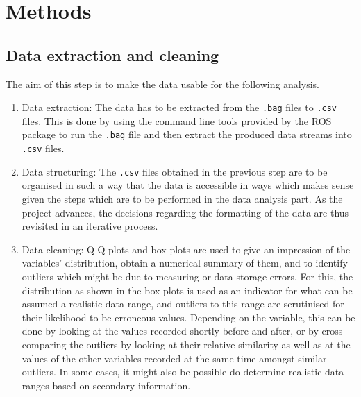 \documentclass[11pt, UKenglish]{report}
\begin{document}
{%

\section*{Methods}

\subsection*{Data extraction and cleaning}

The aim of this step is to make the data usable for the following analysis. 

\begin{enumerate}

	\item{\large{Data extraction:} \normalsize The data has to be extracted from the \texttt{.bag} files to \texttt{.csv} files. This is done by using the command line tools provided by the ROS package to run the \texttt{.bag} file and then extract the produced data streams into \texttt{.csv} files.} 

	\item{\large{Data structuring:} \normalsize The \texttt{.csv} files obtained in the previous step are to be organised in such a way that the data is accessible in ways which makes sense given the steps which are to be performed in the data analysis part. As the project advances, the decisions regarding the formatting of the data are thus revisited in an iterative process.}

	\item{\large{Data cleaning:} \normalsize Q-Q plots and box plots are used to give an impression of the variables' distribution, obtain a numerical summary of them, and to identify outliers which might be due to measuring or data storage errors. For this, the distribution as shown in the box plots is used as an indicator for what can be assumed a realistic data range, and outliers to this range are scrutinised for their likelihood to be erroneous values. Depending on the variable, this can be done by looking at the values recorded shortly before and after, or by cross-comparing the outliers by looking at their relative similarity as well as at the values of the other variables recorded at the same time amongst similar outliers. In some cases, it might also be possible do determine realistic data ranges based on secondary information.}

\end{enumerate}

}
\end{document}
